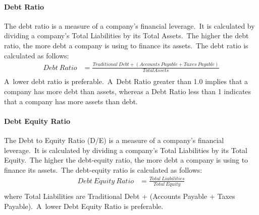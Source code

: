\documentclass[../xlapes02]{subfiles}
\begin{document}
    \paragraph{Debt Ratio}\label{par:debt-ratio}
    The debt ratio is a measure of a company's financial leverage.\ It is calculated by dividing a company's Total Liabilities by its Total Assets.\ The higher the debt ratio, the more debt a company is using to finance its assets.\ The debt ratio is calculated as follows:
    \begin{equation}
        \label{eq:debt-ratio}
        \begin{split}
            Debt\ Ratio&=\frac{Traditional\ Debt+(Accounts\ Payable+Taxes\ Payable)}{Total Assets}\\
        \end{split}
    \end{equation}
    A~lower debt ratio is preferable.\ A~Debt Ratio greater than 1.0 implies that a company has more debt than assets, whereas a Debt Ratio less than 1 indicates that a company has more assets than debt.

    \paragraph{Debt Equity Ratio}\label{par:debt-equity-ratio}
    The Debt to Equity Ratio (D/E) is a measure of a company's financial leverage.\ It is calculated by dividing a company's Total Liabilities by its Total Equity.\ The higher the debt-equity ratio, the more debt a company is using to finance its assets.\ The debt-equity ratio is calculated as follows:
    \begin{equation}
        \label{eq:debt-equity-ratio}
        \begin{split}
            Debt\ Equity\ Ratio&=\frac{Total\ Liabilities}{Total\ Equity}\\
        \end{split}
    \end{equation}
    where Total Liabilities are Traditional Debt + (Accounts Payable + Taxes Payable).\ A~lower Debt Equity Ratio is preferable.
\end{document}
